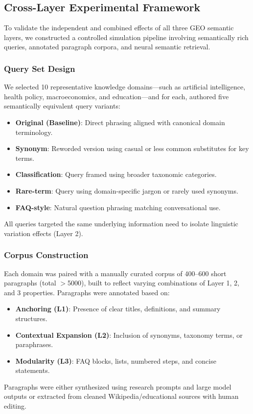 \subsection{Cross-Layer Experimental Framework}

To validate the independent and combined effects of all three GEO semantic layers, we constructed a controlled simulation pipeline involving semantically rich queries, annotated paragraph corpora, and neural semantic retrieval.

\subsubsection{Query Set Design}
We selected 10 representative knowledge domains—such as artificial intelligence, health policy, macroeconomics, and education—and for each, authored five semantically equivalent query variants:
\begin{itemize}
  \item \textbf{Original (Baseline)}: Direct phrasing aligned with canonical domain terminology.
  \item \textbf{Synonym}: Reworded version using casual or less common substitutes for key terms.
  \item \textbf{Classification}: Query framed using broader taxonomic categories.
  \item \textbf{Rare-term}: Query using domain-specific jargon or rarely used synonyms.
  \item \textbf{FAQ-style}: Natural question phrasing matching conversational use.
\end{itemize}
All queries targeted the same underlying information need to isolate linguistic variation effects (Layer 2).

\subsubsection{Corpus Construction}
Each domain was paired with a manually curated corpus of 400–600 short paragraphs (total $>$5000), built to reflect varying combinations of Layer 1, 2, and 3 properties. Paragraphs were annotated based on:
\begin{itemize}
  \item \textbf{Anchoring (L1)}: Presence of clear titles, definitions, and summary structures.
  \item \textbf{Contextual Expansion (L2)}: Inclusion of synonyms, taxonomy terms, or paraphrases.
  \item \textbf{Modularity (L3)}: FAQ blocks, lists, numbered steps, and concise statements.
\end{itemize}
Paragraphs were either synthesized using research prompts and large model outputs or extracted from cleaned Wikipedia/educational sources with human editing.

